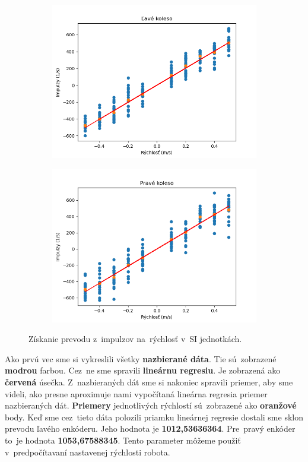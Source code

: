 \begin{figure}[!htbp]
	\begin{subfigure}{0.5\textwidth}
		\includegraphics[width=\textwidth]{img/lw_nf.png}
	\end{subfigure}
	\hfill
	\begin{subfigure}{0.5\textwidth}
		\includegraphics[width=\textwidth]{img/rw_nf.png}
	\end{subfigure}
	\caption{Získanie prevodu z~impulzov na~rýchlosť v~SI jednotkách.}
	\label{fig:rw_lw_nf}
\end{figure}

Ako prvú vec sme si vykreslili všetky \textbf{nazbierané dáta}. Tie sú~zobrazené \textbf{modrou} farbou. Cez~ne
sme spravili \textbf{lineárnu regresiu}. Je zobrazená ako \textbf{červená} úsečka. Z~nazbieraných dát sme si
nakoniec spravili priemer, aby sme videli, ako presne aproximuje nami vypočítaná lineárna regresia priemer
nazbieraných dát. \textbf{Priemery} jednotlivých rýchlostí sú~zobrazené ako \textbf{oranžové} body.
Keď sme cez~tieto dáta polozili priamku lineárnej regresie dostali sme sklon prevodu ľavého enkóderu. Jeho
hodnota je \textbf{1012,53636364}. Pre~pravý enkóder to~je hodnota \textbf{1053,67588345}. Tento parameter
môžeme použiť v~predpočítavaní nastavenej rýchlosti robota.

